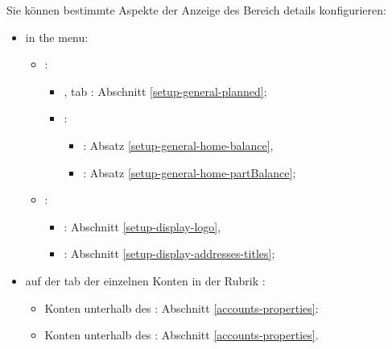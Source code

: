 Sie können bestimmte Aspekte der Anzeige des Bereich details konfigurieren:%
\begin{itemize}
	\item in the  menu:
	\begin{itemize}
		\item {}:
		\begin{itemize}
			\item {}, tab : Abschnitt \vref{setup-general-planned};
			\item {}:
			\begin{itemize}
				\item {}: Absatz \vref{setup-general-home-balance},
				\item {}: Absatz \vref{setup-general-home-partBalance};
			\end{itemize}
		\end{itemize}
		\item {}:
		\begin{itemize}
			\item {}: Abschnitt \vref{setup-display-logo},
			\item {}: Abschnitt \vref{setup-display-addresses-titles};
		\end{itemize}
	\end{itemize}
	\item auf der tab  der einzelnen Konten in der Rubrik :%
	\begin{itemize}
		\item Konten unterhalb des : Abschnitt \vref{accounts-properties}:
		\item Konten unterhalb des : Abschnitt  \vref{accounts-properties}.
	\end{itemize}
\end{itemize}


